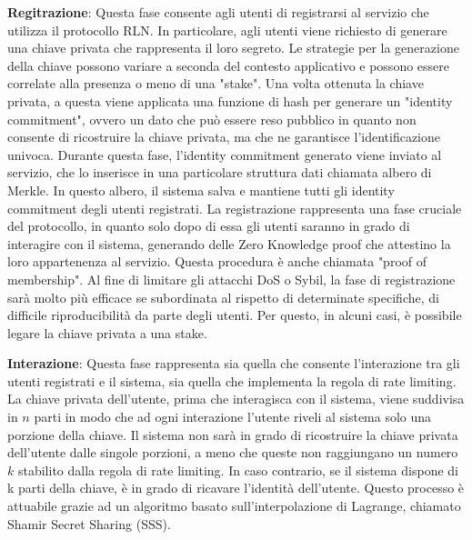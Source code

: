 \textbf{Regitrazione}: Questa fase consente agli utenti di registrarsi al servizio che utilizza il protocollo RLN. In
particolare, agli utenti viene richiesto di generare una chiave privata che rappresenta il loro segreto. Le strategie
per la generazione della chiave possono variare a seconda del contesto applicativo e possono essere correlate alla
presenza o meno di una "stake". Una volta ottenuta la chiave privata, a questa viene applicata una funzione di hash per
generare un "identity commitment", ovvero un dato che può essere reso pubblico in quanto non consente di ricostruire la
chiave privata, ma che ne garantisce l'identificazione univoca. Durante questa fase, l'identity commitment generato
viene inviato al servizio, che lo inserisce in una particolare struttura dati chiamata albero di Merkle. In questo
albero, il sistema salva e mantiene tutti gli identity commitment degli utenti registrati. La registrazione rappresenta
una fase cruciale del protocollo, in quanto solo dopo di essa gli utenti saranno in grado di interagire con il sistema,
generando delle Zero Knowledge proof che attestino la loro appartenenza al servizio. Questa procedura è anche chiamata "proof
of membership". Al fine di limitare gli attacchi DoS o Sybil, la fase di registrazione sarà molto più efficace se
subordinata al rispetto di determinate specifiche, di difficile riproducibilità da parte degli utenti. Per questo, in
alcuni casi, è possibile legare la chiave privata a una stake.

\textbf{Interazione}: Questa fase rappresenta sia quella che consente l'interazione tra gli utenti registrati e il
sistema, sia quella che implementa la regola di rate limiting. La chiave privata dell'utente, prima che interagisca con
il sistema, viene suddivisa in $n$ parti in modo che ad ogni interazione l'utente riveli al sistema solo una porzione
della chiave. Il sistema non sarà in grado di ricostruire la chiave privata dell'utente dalle singole porzioni, a meno
che queste non raggiungano un numero $k$ stabilito dalla regola di rate limiting. In caso contrario, se il sistema
dispone di k parti della chiave, è in grado di ricavare l'identità dell'utente. Questo processo è attuabile grazie ad un
algoritmo basato sull'interpolazione di Lagrange, chiamato Shamir Secret Sharing (SSS).


